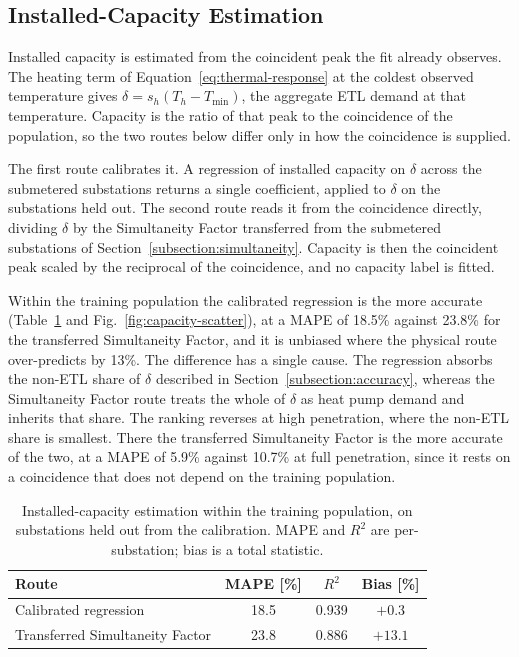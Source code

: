 \documentclass[9pt,journal,a4]{IEEEtran}
\begin{document}
\subsection{Installed-Capacity Estimation}
\label{subsection:capacity}

Installed capacity is estimated from the coincident peak the fit already observes. The heating term of Equation~\eqref{eq:thermal-response} at the coldest observed temperature gives $\delta = s_h (T_h - T_{\min})$, the aggregate ETL demand at that temperature. Capacity is the ratio of that peak to the coincidence of the population, so the two routes below differ only in how the coincidence is supplied.

The first route calibrates it. A regression of installed capacity on $\delta$ across the submetered substations returns a single coefficient, applied to $\delta$ on the substations held out. The second route reads it from the coincidence directly, dividing $\delta$ by the Simultaneity Factor transferred from the submetered substations of Section~\ref{subsection:simultaneity}. Capacity is then the coincident peak scaled by the reciprocal of the coincidence, and no capacity label is fitted.

Within the training population the calibrated regression is the more accurate (Table~\ref{tab:capacity} and Fig.~\ref{fig:capacity-scatter}), at a MAPE of 18.5\% against 23.8\% for the transferred Simultaneity Factor, and it is unbiased where the physical route over-predicts by 13\%. The difference has a single cause. The regression absorbs the non-ETL share of $\delta$ described in Section~\ref{subsection:accuracy}, whereas the Simultaneity Factor route treats the whole of $\delta$ as heat pump demand and inherits that share. The ranking reverses at high penetration, where the non-ETL share is smallest. There the transferred Simultaneity Factor is the more accurate of the two, at a MAPE of 5.9\% against 10.7\% at full penetration, since it rests on a coincidence that does not depend on the training population.

\begin{table}[t]
\centering
\caption{Installed-capacity estimation within the training population, on substations held out from the calibration. MAPE and $R^2$ are per-substation; bias is a total statistic.}
\label{tab:capacity}
\begin{tabular}{lccc}
\toprule
Route & MAPE [\%] & $R^2$ & Bias [\%] \\
\midrule
Calibrated regression & 18.5 & 0.939 & $+0.3$ \\
Transferred Simultaneity Factor & 23.8 & 0.886 & $+13.1$ \\
\bottomrule
\end{tabular}
\end{table}
\end{document}
